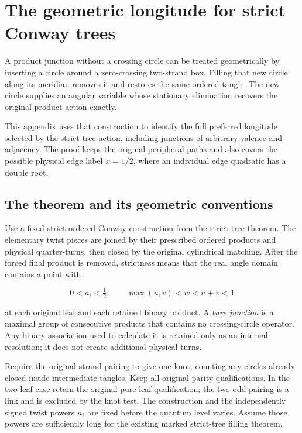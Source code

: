 \chapter{The geometric longitude for strict Conway trees}
\label{app:strict-tree-geometric-characteristic}\label{gj:the-geometric-longitude-for-strict-conway-trees}

A product junction without a crossing circle can be treated geometrically
by inserting a circle around a zero-crossing two-strand box. Filling
that new circle along its meridian removes it and restores the same
ordered tangle. The new circle supplies an angular variable whose
stationary elimination recovers the original product action exactly.

This appendix uses that construction to identify the full preferred
longitude selected by the strict-tree action, including junctions
of arbitrary valence and adjacency. The proof keeps the original
peripheral paths and also covers the possible physical edge label
\(x=1/2\), where an individual edge quadratic has a double root.

\section{The theorem and its geometric conventions}\label{gj:the-theorem-and-its-geometric-conventions}

Use a fixed strict ordered Conway construction from the
\href{https://sashakolpakov.github.io/murakamis_dream/notes/actual_conway_all_strict_tree_long_twist_volume.html}{strict-tree theorem}.
The elementary twist pieces are joined by their prescribed ordered
products and physical quarter-turns, then closed by the original
cylindrical matching. After the forced final product is removed,
strictness means that the real angle domain contains a point with

\begin{equation}\label{gj:T1}
0<a_i<\tfrac12,\qquad
              \max(u,v)<w<u+v<1
\end{equation}

at each original leaf and each retained binary product.
A \emph{bare junction} is a maximal group of consecutive products that
contains no crossing-circle operator. Any binary association used
to calculate it is retained only as an internal resolution;
it does not create additional physical turns.

Require the original strand pairing to give one knot, counting
any circles already closed inside intermediate tangles. Keep all
original parity qualifications. In the two-leaf case retain the
original pure-leaf qualification; the two-odd pairing is a link
and is excluded by the knot test. The construction and
the independently signed twist powers \(n_i\) are fixed before
the quantum level varies. Assume those powers are sufficiently
long for the existing marked strict-tree filling theorem.

